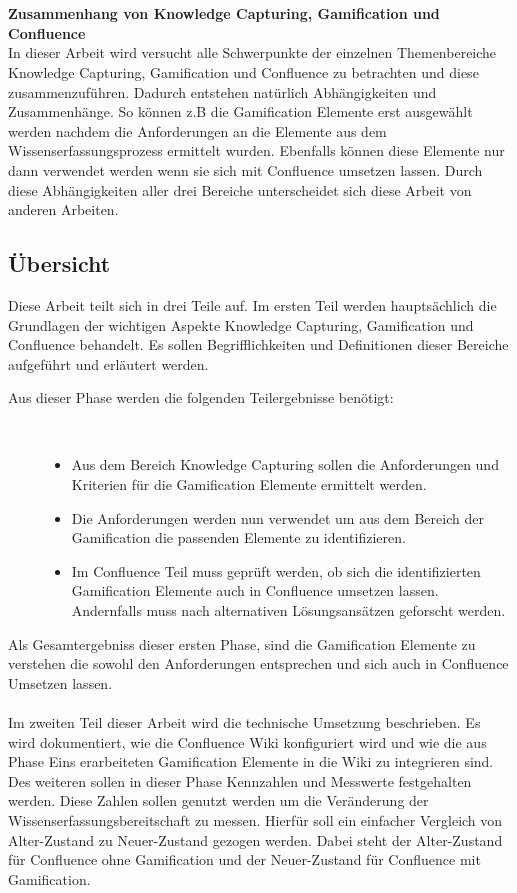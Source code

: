 \documentclass[a4paper,12pt]{scrartcl}
\begin{document}
\\\\
\textbf{Zusammenhang von Knowledge Capturing, Gamification und Confluence}\\
In dieser Arbeit wird versucht alle Schwerpunkte der einzelnen Themenbereiche Knowledge Capturing, Gamification und Confluence zu betrachten und diese zusammenzuführen. Dadurch entstehen natürlich Abhängigkeiten und Zusammenhänge. So können z.B die Gamification Elemente erst ausgewählt werden nachdem die Anforderungen an die Elemente aus dem Wissenserfassungsprozess ermittelt wurden. Ebenfalls können diese Elemente nur dann verwendet werden wenn sie sich mit Confluence umsetzen lassen. Durch diese Abhängigkeiten aller drei Bereiche unterscheidet sich diese Arbeit von anderen Arbeiten.
\subsection{Übersicht}
Diese Arbeit teilt sich in drei Teile auf. Im ersten Teil werden hauptsächlich die Grundlagen der wichtigen Aspekte Knowledge Capturing, Gamification und Confluence behandelt. Es sollen Begrifflichkeiten und Definitionen dieser Bereiche aufgeführt und erläutert werden. 
\begin{description}
   \item[Aus dieser Phase werden die folgenden Teilergebnisse benötigt:]~\par
   \begin{itemize}
      \item Aus dem Bereich Knowledge Capturing sollen die Anforderungen und Kriterien für die Gamification Elemente ermittelt werden.
      \item Die Anforderungen werden nun verwendet um aus dem Bereich der Gamification die passenden Elemente zu identifizieren.
      \item Im Confluence Teil muss geprüft werden, ob sich die identifizierten Gamification Elemente auch in Confluence umsetzen lassen. Andernfalls muss nach alternativen Lösungsansätzen geforscht werden.
   \end{itemize}
\end{description}
Als Gesamtergebniss dieser ersten Phase, sind die Gamification Elemente zu verstehen die sowohl den Anforderungen entsprechen und sich auch in Confluence Umsetzen lassen.
\\\\
Im zweiten Teil dieser Arbeit wird die technische Umsetzung beschrieben. Es wird dokumentiert, wie die Confluence Wiki konfiguriert wird und wie die aus Phase Eins erarbeiteten Gamification Elemente in die Wiki zu integrieren sind. Des weiteren sollen in dieser Phase Kennzahlen und Messwerte festgehalten werden. Diese Zahlen sollen genutzt werden um die Veränderung der Wissenserfassungsbereitschaft zu messen. Hierfür soll ein einfacher Vergleich von Alter-Zustand zu Neuer-Zustand gezogen werden. Dabei steht der Alter-Zustand für Confluence ohne Gamification und der Neuer-Zustand für Confluence mit Gamification.
\end{document}
